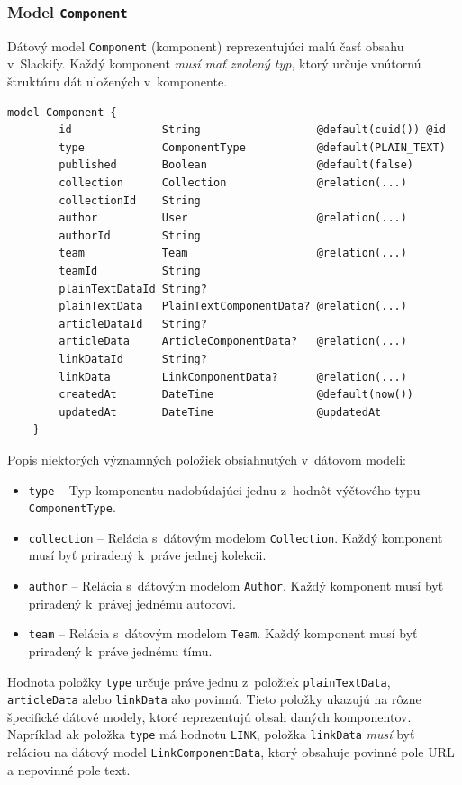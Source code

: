 \subsubsection{Model \texttt{Component}}
\label{impl:model:component}
Dátový model \texttt{Component} (komponent) reprezentujúci malú časť obsahu v~Slackify. Každý komponent \emph{musí mať zvolený typ}, ktorý určuje vnútornú štruktúru dát uložených v~komponente. \\

\begin{lstlisting}[language={Prisma}, caption=Dátový model \texttt{Component} v~konfiguračnom súbore \texttt{prisma}.]
	model Component {
		id              String                  @default(cuid()) @id
		type            ComponentType           @default(PLAIN_TEXT)
		published       Boolean                 @default(false)
		collection      Collection              @relation(...)
		collectionId    String
		author          User                    @relation(...)
		authorId        String
		team            Team                    @relation(...)
		teamId          String
		plainTextDataId String?
		plainTextData   PlainTextComponentData? @relation(...)
		articleDataId   String?
		articleData     ArticleComponentData?   @relation(...)
		linkDataId      String?
		linkData        LinkComponentData?      @relation(...)
		createdAt       DateTime                @default(now())
		updatedAt       DateTime                @updatedAt
	}
\end{lstlisting}

\medskip

\noindent Popis niektorých významných položiek obsiahnutých v~dátovom modeli:

\begin{itemize}
	\item \texttt{type} -- Typ komponentu nadobúdajúci jednu z~hodnôt výčtového typu \texttt{ComponentType}.
	\item \texttt{collection} -- Relácia s~dátovým modelom \texttt{Collection}. Každý komponent musí byť priradený k~práve jednej kolekcii.
	\item \texttt{author} -- Relácia s~dátovým modelom \texttt{Author}. Každý komponent musí byť priradený k~právej jednému autorovi.
	\item \texttt{team} -- Relácia s~dátovým modelom \texttt{Team}. Každý komponent musí byť priradený k~práve jednému tímu.
\end{itemize}

\noindent Hodnota položky \texttt{type} určuje práve jednu z~položiek \texttt{plainTextData}, \texttt{articleData} alebo \texttt{linkData} ako povinnú. Tieto položky ukazujú na rôzne špecifické dátové modely, ktoré reprezentujú obsah daných komponentov. Napríklad ak položka \texttt{type} má hodnotu \texttt{LINK}, položka \texttt{linkData} \emph{musí} byť reláciou na dátový model \texttt{LinkComponentData}, ktorý obsahuje povinné pole URL a nepovinné pole text. \\

